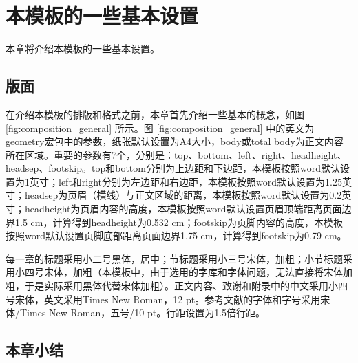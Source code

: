 \chapter{本模板的一些基本设置}
\label{cha:format}
本章将介绍本模板的一些基本设置。
\section{版面}
\label{sec:composition}
在介绍本模板的排版和格式之前，本章首先介绍一些基本的概念，如图 \ref{fig:composition_general} 所示。图 \ref{fig:composition_general} 中的英文为geometry宏包中的参数，纸张默认设置为A4大小，body或total body为正文内容所在区域。重要的参数有7个，分别是：top、bottom、left、right、headheight、headsep、footskip。top和bottom分别为上边距和下边距，本模板按照word默认设置为1英寸；left和right分别为左边距和右边距，本模板按照word默认设置为1.25英寸；headsep为页眉（横线）与正文区域的距离，本模板按照word默认设置为0.2英寸；headheight为页眉内容的高度，本模板按照word默认设置页眉顶端距离页面边界1.5 cm，计算得到headheight为0.532 cm；footskip为页脚内容的高度，本模板按照word默认设置页脚底部距离页面边界1.75 cm，计算得到footskip为0.79 cm。


每一章的标题采用小二号黑体，居中；节标题采用小三号宋体，加粗；小节标题采用小四号宋体，加粗（本模板中，由于选用的字库和字体问题，无法直接将宋体加粗，于是实际采用黑体代替宋体加粗）。正文内容、致谢和附录中的中文采用小四号宋体，英文采用Times New Roman，12 pt。参考文献的字体和字号采用宋体/Times New Roman，五号/10 pt。行距设置为1.5倍行距。

\section{本章小结}

